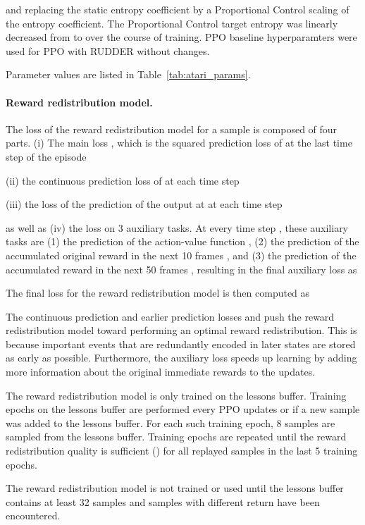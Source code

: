 \documentclass{article}
\begin{document}
\begin{appendices}
and replacing the static entropy coefficient by a Proportional Control scaling of 
the entropy coefficient.
The Proportional Control target entropy was linearly decreased from  to  over 
the course of training.
PPO baseline hyperparamters were used for PPO with RUDDER without changes.

Parameter values are listed in Table~\ref{tab:atari_params}.

\paragraph{Reward redistribution model.}
The loss of the reward redistribution model for a sample is composed of four parts.
(i) The main loss ,
which is the squared prediction loss of  at the last time step  of the episode

(ii) the continuous prediction loss  of  at each time step

(iii) the loss  of the prediction of the output at  at each time step 

as well as (iv) the loss on 3 auxiliary tasks.
At every time step ,
these auxiliary tasks are
(1) the prediction of the action-value function ,
(2) the prediction of the accumulated original reward  in the next 10 frames 
,
and (3) the prediction of the accumulated reward in the next 50 frames
,
resulting in the final auxiliary loss  as


The final loss for the reward redistribution model is then computed as


The continuous prediction and earlier prediction losses  and 
push the reward redistribution model toward performing an optimal reward redistribution.
This is because important events that are redundantly encoded 
in later states are stored as early as possible.
Furthermore, the auxiliary loss  speeds up learning 
by adding more information about the original immediate rewards to the updates.

The reward redistribution model is only trained on the lessons buffer.
Training epochs on the lessons buffer are performed every  PPO updates or if a new sample was added to the lessons buffer.
For each such training epoch, 8 samples are sampled from the lessons buffer.
Training epochs are repeated until the reward redistribution quality 
is sufficient () for all replayed samples in the last 5 training epochs.

The reward redistribution model is not trained or used until
the lessons buffer contains at least 32 samples
and samples with different return have been encountered.


\end{appendices}
\end{document}
